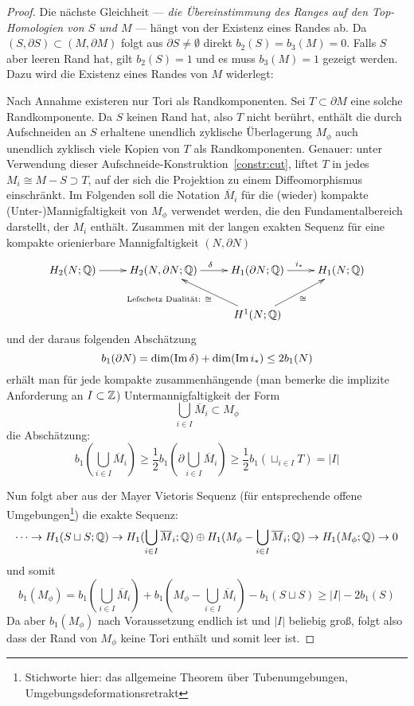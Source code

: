 \begin{proof}
	 Die nächste Gleichheit --- \emph{die Übereinstimmung des Ranges auf den Top-Homologien von $S$ und $M$} --- hängt von der Existenz eines Randes ab. Da $(S,\partial S) \subset (M,\partial M)$ folgt aus $\partial S \neq \emptyset$ direkt $b_2(S)=b_3(M)=0$. Falls $S$ aber leeren Rand hat, gilt $b_2(S)=1$ und es muss $b_3(M)=1$ gezeigt werden. Dazu wird die Existenz eines Randes von $M$ widerlegt:

	 Nach Annahme existeren nur Tori als Randkomponenten. Sei $T \subset \partial M$ eine solche Randkomponente. Da $S$ keinen Rand hat, also $T$ nicht berührt, enthält die durch Aufschneiden an $S$ erhaltene unendlich zyklische Überlagerung $M_\phi$ auch unendlich zyklisch viele Kopien von $T$ als Randkomponenten. Genauer: unter Verwendung dieser Aufschneide-Konstruktion~\ref{constr:cut}, liftet $T$ in jedes $M_i \cong M - S \supset T$, auf der sich die Projektion zu einem Diffeomorphismus einschränkt. Im Folgenden soll die Notation $\overline M_i$ für die (wieder) kompakte (Unter-)Mannigfaltigkeit von $M_\phi$ verwendet werden, die den Fundamentalbereich darstellt, der $M_i$ enthält. Zusammen mit der langen exakten Sequenz für eine kompakte orienierbare Mannigfaltigkeit $(N,\partial N)$
	\[
	 \begin{xy}
	 	\xymatrix{
	 	H_2(N;\QQ) \ar[r]&  H_2(N,\partial N ; \QQ) \ar[r]^\delta & H_1(\partial N;\QQ) \ar[r]^{i_*}& H_1(N;\QQ) \\
	 	& &H^1(N;\QQ) \ar[ru]_{\cong} \ar[lu]^{\text{Lefschetz Dualität: }\cong \qquad~}&}
	 \end{xy}
	 \] 
	 und der daraus folgenden Abschätzung
	 \[
	 	b_1(\partial N) = \dim(\operatorname{Im} \delta) + \dim(\operatorname{Im} i_*) \leq  2b_1(N)
	 \]
	 erhält man für jede kompakte zusammenhängende (man bemerke die implizite Anforderung an $I\subset \mathbb{Z}$) Untermannigfaltigkeit der Form 
	 \[
	  	\bigcup_{i\in I} \overline M_i \subset M_\phi 
	  \]
	  die Abschätzung:
	  \[
	   	b_1(\bigcup_{i\in I} \overline M_i)\geq \frac{1}{2}b_1(\partial \bigcup_{i\in I} \overline M_i) \geq \frac{1}{2}b_1(\sqcup_{i \in I}T) = |I|
	  \]


	 \noindent Nun folgt aber aus der Mayer Vietoris Sequenz (für entsprechende offene Umgebungen\footnote{Stichworte hier: das allgemeine Theorem über Tubenumgebungen, Umgebungsdeformationsretrakt}) die exakte Sequenz:
	  \[
	  	\cdots\to H_1(S\sqcup S;\mathbb{Q}) \to H_1(\bigcup_{i \in I} \overline M_i;\mathbb{Q}) \oplus H_1(M_\phi -\bigcup_{i \in I} \overline M_i;\mathbb{Q}) \to H_1(M_\phi;\mathbb{Q}) \to 0
	  \]
	  und somit
	  \[
	  	b_1(M_\phi)= b_1(\bigcup_{i \in I} \overline M_i)+b_1(M_\phi -\bigcup_{i \in I} \overline M_i)-b_1(S\sqcup S) \geq |I| -2b_1(S)
	  \]
	  Da aber $b_1(M_\phi)$ nach Voraussetzung endlich ist und $|I|$ beliebig groß, folgt also dass der Rand von $M_\phi$ keine Tori enthält und somit leer ist.


\end{proof}
